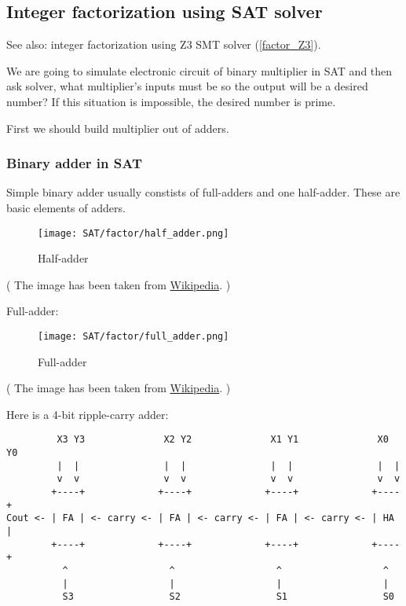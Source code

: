 \subsection{Integer factorization using SAT solver}
\label{factor_SAT}

See also: integer factorization using Z3 SMT solver (\ref{factor_Z3}).

We are going to simulate electronic circuit of binary multiplier in SAT and then ask solver, what multiplier's inputs must be so the output will be a desired number?
If this situation is impossible, the desired number is prime.

First we should build multiplier out of adders.

\subsubsection{Binary adder in SAT}

Simple binary adder usually constists of full-adders and one half-adder.
These are basic elements of adders.

\begin{figure}[H]
\centering
\texttt{[image: SAT/factor/half\_adder.png]}
\caption{Half-adder}
\end{figure}

( The image has been taken from \href{https://en.wikipedia.org/wiki/Adder_(electronics)}{Wikipedia}. )

Full-adder:

\begin{figure}[H]
\centering
\texttt{[image: SAT/factor/full\_adder.png]}
\caption{Full-adder}
\end{figure}

( The image has been taken from \href{https://en.wikipedia.org/wiki/Adder_(electronics)}{Wikipedia}. )

Here is a 4-bit ripple-carry adder:

\begin{lstlisting}
         X3 Y3              X2 Y2              X1 Y1              X0 Y0
         |  |               |  |               |  |               |  |
         v  v               v  v               v  v               v  v
        +----+             +----+             +----+             +----+
Cout <- | FA | <- carry <- | FA | <- carry <- | FA | <- carry <- | HA |
        +----+             +----+             +----+             +----+
          ^                  ^                  ^                  ^
          |                  |                  |                  |
          S3                 S2                 S1                 S0
\end{lstlisting}


